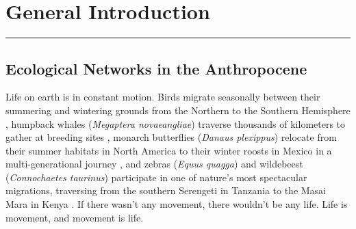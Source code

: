 \documentclass[../FinalThesis.tex]{subfiles}
\begin{document}
\chapter{General Introduction}
\label{GeneralIntroduction}
\thispagestyle{empty}
\vspace{-1cm}
\noindent\hfil\rule{0.75\textwidth}{.4pt}\hfil

\newpage



\section{Ecological Networks in the Anthropocene}

Life on earth is in constant motion. Birds migrate seasonally between their
summering and wintering grounds from the Northern to the Southern Hemisphere
\citep{Alerstam.1993}, humpback whales (\textit{Megaptera novaeangliae})
traverse thousands of kilometers to gather at breeding sites
\citep{Rasmussen.2007}, monarch butterflies (\textit{Danaus plexippus}) relocate
from their summer habitats in North America to their winter roosts in Mexico in
a multi-generational journey \citep{Reppert.2018}, and zebras (\textit{Equus
quagga}) and wildebeest (\textit{Connochaetes taurinus}) participate in one of
nature's most spectacular migrations, traversing from the southern Serengeti in
Tanzania to the Masai Mara in Kenya \citep{Serneels.2001}. If there wasn't any
movement, there wouldn't be any life. Life is movement, and movement is life.
\end{document}
